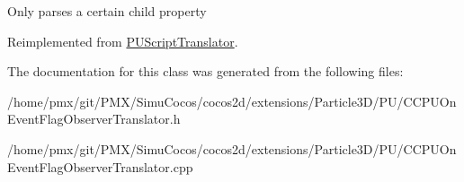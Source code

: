 Only parses a certain child property 

Reimplemented from \hyperlink{classPUScriptTranslator_a0374d83a8a04e57918975d525e0f8fe8}{P\+U\+Script\+Translator}.



The documentation for this class was generated from the following files\+:\begin{DoxyCompactItemize}
\item 
/home/pmx/git/\+P\+M\+X/\+Simu\+Cocos/cocos2d/extensions/\+Particle3\+D/\+P\+U/C\+C\+P\+U\+On\+Event\+Flag\+Observer\+Translator.\+h\item 
/home/pmx/git/\+P\+M\+X/\+Simu\+Cocos/cocos2d/extensions/\+Particle3\+D/\+P\+U/C\+C\+P\+U\+On\+Event\+Flag\+Observer\+Translator.\+cpp\end{DoxyCompactItemize}
